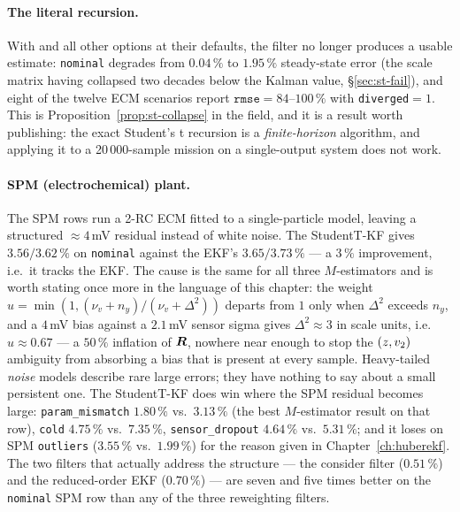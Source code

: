 \paragraph{The literal recursion.}  With  and all other options at
their defaults, the filter no longer produces a usable estimate: \texttt{nominal} degrades from
$0.04\,\%$ to $1.95\,\%$ steady-state error (the scale matrix having collapsed two decades below
the Kalman value, \S\ref{sec:st-fail}), and eight of the twelve ECM scenarios report
$\texttt{rmse}=84$--$100\,\%$ with \texttt{diverged}$=1$.  This is
Proposition~\ref{prop:st-collapse} in the field, and it is a result worth publishing: the exact
Student's t recursion is a \emph{finite-horizon} algorithm, and applying it to a 20\,000-sample
mission on a single-output system does not work.

\paragraph{SPM (electrochemical) plant.}  The SPM rows run a 2-RC ECM fitted to a single-particle
model, leaving a structured $\approx4$\,mV residual instead of white noise.  The StudentT-KF gives
$3.56/3.62\,\%$ on \texttt{nominal} against the EKF's $3.65/3.73\,\%$ --- a $3\,\%$ improvement,
i.e.\ it tracks the EKF.  The cause is the same for all three $M$-estimators and is worth stating
once more in the language of this chapter: the weight $u=\min(1,(\nu_v+n_y)/(\nu_v+\Delta^2))$
departs from $1$ only when $\Delta^2$ exceeds $n_y$, and a $4$\,mV bias against a $2.1$\,mV sensor
sigma gives $\Delta^2\approx3$ in scale units, i.e.\ $u\approx0.67$ --- a $50\,\%$ inflation of
$\bm{R}$, nowhere near enough to stop the $(z,v_2)$ ambiguity from absorbing a bias that is present
at every sample.  Heavy-tailed \emph{noise} models describe rare large errors; they have nothing to
say about a small persistent one.  The StudentT-KF does win where the SPM residual becomes large:
\texttt{param\_mismatch} $1.80\,\%$ vs.\ $3.13\,\%$ (the best $M$-estimator result on that row),
\texttt{cold} $4.75\,\%$ vs.\ $7.35\,\%$, \texttt{sensor\_dropout} $4.64\,\%$ vs.\ $5.31\,\%$; and
it loses on SPM \texttt{outliers} ($3.55\,\%$ vs.\ $1.99\,\%$) for the reason given in
Chapter~\ref{ch:huberekf}.  The two filters that actually address the structure --- the consider
filter ($0.51\,\%$) and the reduced-order EKF ($0.70\,\%$) --- are seven and five times better on
the \texttt{nominal} SPM row than any of the three reweighting filters.


